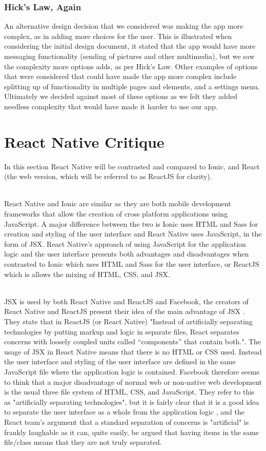\documentclass[a4paper, 11pt]{article}
\begin{document}
\subsubsection{Hick's Law, Again}

An alternative design decision that we considered was making the app more complex, as in adding more choices for the user. This is illustrated when considering the initial design document, it stated that the app would have more messaging functionality (sending of pictures and other multimedia), but we saw the complexity more options adds, as per Hick's Law. Other examples of options that were considered that could have made the app more complex include splitting up of functionality in multiple pages and elements, and a settings menu. Ultimately we decided against most of these options as we felt they added needless complexity that would have made it harder to use our app.

\section{React Native Critique}

In this section React Native will be contrasted and compared to Ionic, and React (the web version, which will be referred to as ReactJS for clarity).

~\\
React Native and Ionic are similar as they are both mobile development frameworks that allow the creation of cross platform applications using JavaScript. A major difference between the two is Ionic uses HTML and Sass for creation and styling of the user interface and React Native uses JavaScript, in the form of JSX. React Native's approach of using JavaScript for the application logic and the user interface presents both advantages and disadvantages when contrasted to Ionic which uses HTML and 
Sass for the user interface, or ReactJS which is allows the mixing of HTML, CSS, and JSX.

~\\
JSX is used by both React Native and ReactJS and Facebook, the creators of React Native and ReactJS present their idea of the main advantage of JSX \cite{advantages}. They state that in ReactJS (or React Native) "Instead of artificially separating technologies by putting markup and logic in separate files, React separates concerns with loosely coupled units called “components” that contain both.". The usage of JSX in React Native means that there is no HTML or CSS used. Instead the user interface and styling of the user interface are defined in the same JavaScript file where the application logic is contained. Facebook therefore seems to think that a major disadvantage of normal web or non-native web development is the usual three file system of HTML, CSS, and JavaScript. They refer to this as "artificially separating technologies", but it is fairly clear that it is a good idea to separate the user interface as a whole from the application logic \cite{sep}, and the React team's argument that a standard separation of concerns is "artificial" is frankly laughable as it can, quite easily, be argued that having items in the same file/class means that they are not truly separated.
\end{document}
